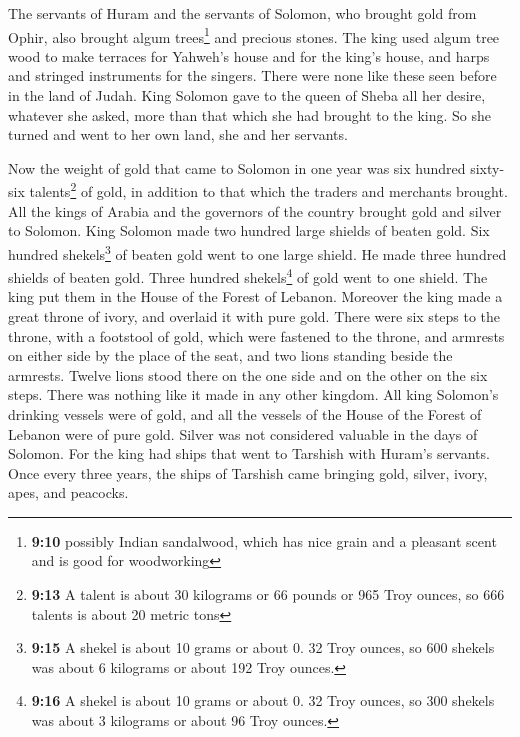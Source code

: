  The servants of Huram and the servants of Solomon, who
brought gold from Ophir, also brought algum trees\footnote{\textbf{9:10}
  possibly Indian sandalwood, which has nice grain and a pleasant scent
  and is good for woodworking} and precious stones.  The
king used algum tree wood to make terraces for Yahweh's house and for
the king's house, and harps and stringed instruments for the singers.
There were none like these seen before in the land of Judah.
 King Solomon gave to the queen of Sheba all her desire,
whatever she asked, more than that which she had brought to the king. So
she turned and went to her own land, she and her servants.

 Now the weight of gold that came to Solomon in one year
was six hundred sixty-six talents\footnote{\textbf{9:13} A talent is
  about 30 kilograms or 66 pounds or 965 Troy ounces, so 666 talents is
  about 20 metric tons} of gold,  in addition to that
which the traders and merchants brought. All the kings of Arabia and the
governors of the country brought gold and silver to Solomon.
 King Solomon made two hundred large shields of beaten
gold. Six hundred shekels\footnote{\textbf{9:15} A shekel is about 10
  grams or about 0. 32 Troy ounces, so 600 shekels was about 6 kilograms
  or about 192 Troy ounces.} of beaten gold went to one large shield.
 He made three hundred shields of beaten gold. Three
hundred shekels\footnote{\textbf{9:16} A shekel is about 10 grams or
  about 0. 32 Troy ounces, so 300 shekels was about 3 kilograms or about
  96 Troy ounces.} of gold went to one shield. The king put them in the
House of the Forest of Lebanon.  Moreover the king made a
great throne of ivory, and overlaid it with pure gold. 
There were six steps to the throne, with a footstool of gold, which were
fastened to the throne, and armrests on either side by the place of the
seat, and two lions standing beside the armrests.  Twelve
lions stood there on the one side and on the other on the six steps.
There was nothing like it made in any other kingdom.  All
king Solomon's drinking vessels were of gold, and all the vessels of the
House of the Forest of Lebanon were of pure gold. Silver was not
considered valuable in the days of Solomon.  For the king
had ships that went to Tarshish with Huram's servants. Once every three
years, the ships of Tarshish came bringing gold, silver, ivory, apes,
and peacocks.

